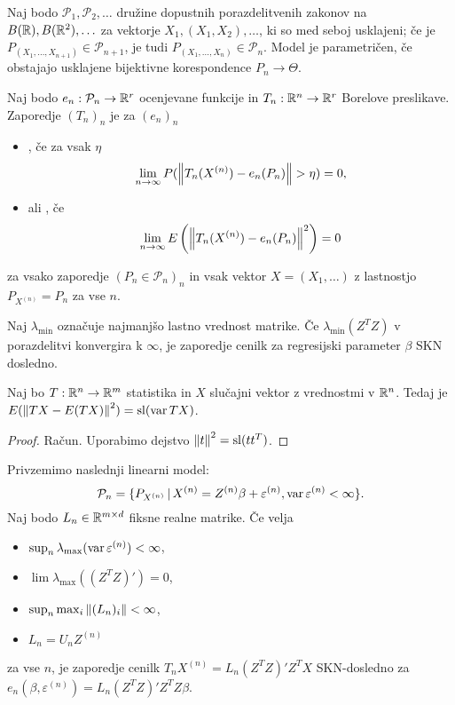 Naj bodo $\mathcal{P}_1, \mathcal{P}_2, \ldots$ družine dopustnih
porazdelitvenih zakonov na $B(\mathbb{R}), B(\mathbb{R}^2), \ldots$ za vektorje $X_1, (X_1,
X_2), \ldots$, ki so med seboj usklajeni; če je $P_{(X_1, \ldots, X_{n+1})} \in
\mathcal{P}_{n+1}$, je tudi $P_{(X_1, \ldots, X_n)} \in \mathcal{P}_n$.
Model je parametričen, če obstajajo usklajene bijektivne korespondence $P_n \to
\Theta$.

\begin{definicija}
  Naj bodo $e_n: \mathcal{P}_n \to \mathbb{R}^r$ ocenjevane funkcije in $T_n: \mathbb{R}^n \to
  \mathbb{R}^r$ Borelove preslikave.
  Zaporedje $(T_n)_n$ je za $(e_n)_n$
  \begin{itemize}
  \item {}, če za vsak $\eta$
	\[
	  \lim_{n \to \infty} P(\left\lVert T_n(X^{(n)}) - e_n(P_n)\right\rVert > \eta) = 0,
	\]
  \item {} ali , če
	\[
	  \lim_{n \to \infty} E\left(\left\lVert T_n(X^{(n)}) - e_n(P_n)\right\rVert^2\right) = 0
	\]
  \end{itemize}
  za vsako zaporedje $(P_n \in \mathcal{P}_n)_n$ in vsak vektor $X = (X_1,
  \ldots)$ z lastnostjo $P_{X^{(n)}} = P_n$ za vse $n$.
\end{definicija}

\begin{izrek}
  Naj $\lambda_{\text{min}}$ označuje najmanjšo lastno vrednost matrike.
  Če $\lambda_{\text{min}}(Z^T Z)$ v porazdelitvi konvergira k $\infty$, je
  zaporedje cenilk za regresijski parameter $\beta$ SKN dosledno.
\end{izrek}

\begin{trditev}
  Naj bo $T: \mathbb{R}^n \to \mathbb{R}^m$ statistika in $X$ slučajni vektor z vrednostmi v
  $\mathbb{R}^n$.
  Tedaj je $E(\left\lVert TX - E(TX)\right\rVert^2) = \operatorname{sl}(\operatorname{var} TX)$.
\end{trditev}

\begin{proof}
  Račun.
  Uporabimo dejstvo $\left\lVert t\right\rVert^2 = \operatorname{sl}(t t^T)$.
\end{proof}

\begin{izrek}
  Privzemimo naslednji linearni model:
  \[
	\mathcal{P}_n = \{ P_{X^{(n)}} \,|\, X^{(n)} = Z^{(n)} \beta +
	\varepsilon^{(n)}, \operatorname{var} \varepsilon^{(n)} < \infty \}.
  \]
  Naj bodo $L_n \in \mathbb{R}^{m \times d}$ fiksne realne matrike.
  Če velja
  \begin{itemize}
  \item $\sup_n \lambda_{\text{max}}(\operatorname{var} \varepsilon^{(n)}) < \infty$,
  \item $\lim \lambda_{\text{max}}((Z^T Z)') = 0$,
  \item $\sup_n \max_i \left\lVert(L_n)_i\right\rVert < \infty$,
  \item $L_n = U_n Z^{(n)}$
  \end{itemize}
  za vse $n$, je zaporedje cenilk $T_n X^{(n)} = L_n(Z^T Z)' Z^T X$ SKN-dosledno
  za $e_n(\beta, \varepsilon^{(n)}) = L_n (Z^T Z)' Z^T Z \beta$.
\end{izrek}

